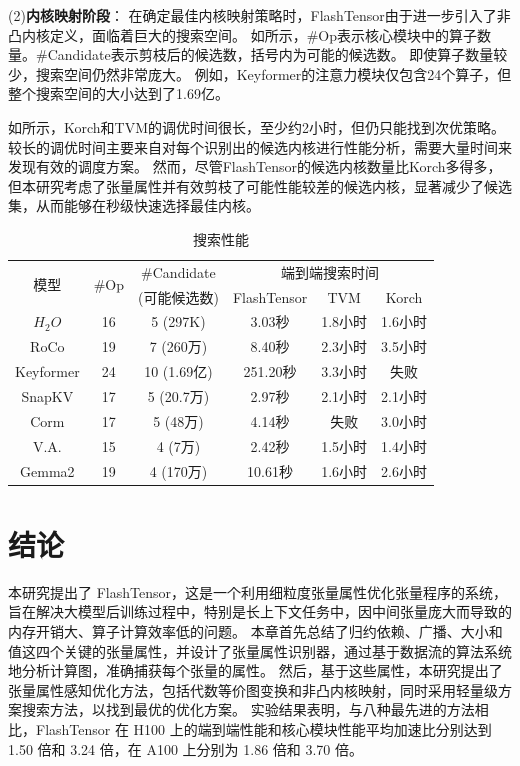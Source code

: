 (2)\textbf{内核映射阶段}：
在确定最佳内核映射策略时，FlashTensor由于进一步引入了非凸内核定义，面临着巨大的搜索空间。
如所示，\#Op表示核心模块中的算子数量。\#Candidate表示剪枝后的候选数，括号内为可能的候选数。
即使算子数量较少，搜索空间仍然非常庞大。
例如，Keyformer的注意力模块仅包含24个算子，但整个搜索空间的大小达到了1.69亿。

如所示，Korch和TVM的调优时间很长，至少约2小时，但仍只能找到次优策略。
较长的调优时间主要来自对每个识别出的候选内核进行性能分析，需要大量时间来发现有效的调度方案。
然而，尽管FlashTensor的候选内核数量比Korch多得多，但本研究考虑了张量属性并有效剪枝了可能性能较差的候选内核，显著减少了候选集，从而能够在秒级快速选择最佳内核。

\begin{table}[ht]
    \centering
    \caption{搜索性能}
    \begin{tabular}{cccccc}
    \toprule
      \multirow{2}{*}{模型} &  \multirow{2}{*}{\#Op}  & \#Candidate& \multicolumn{3}{c}{端到端搜索时间} \\
                              &  & (可能候选数)& FlashTensor & TVM & Korch \\
      \hline
      \(H_{2}O\)      & 16 & 5 (297K) & 3.03秒    & 1.8小时   & 1.6小时\\
      RoCo      & 19 & 7 (260万) & 8.40秒    & 2.3小时   & 3.5小时\\
      Keyformer & 24 & 10 (1.69亿) & 251.20秒 &3.3小时    & 失败 \\
      SnapKV    & 17 & 5 (20.7万) & 2.97秒    & 2.1小时   & 2.1小时\\
      Corm      & 17 & 5 (48万) & 4.14秒    & 失败 & 3.0小时\\
      V.A. & 15 & 4 (7万) & 2.42秒          & 1.5小时   & 1.4小时\\
      Gemma2    & 19  & 4 (170万) & 10.61秒  & 1.6小时   & 2.6小时 \\
      \bottomrule
    \end{tabular}
    \label{tab:search}
\end{table}


\section{结论}
本研究提出了 FlashTensor，这是一个利用细粒度张量属性优化张量程序的系统，旨在解决大模型后训练过程中，特别是长上下文任务中，因中间张量庞大而导致的内存开销大、算子计算效率低的问题。
本章首先总结了归约依赖、广播、大小和值这四个关键的张量属性，并设计了张量属性识别器，通过基于数据流的算法系统地分析计算图，准确捕获每个张量的属性。
然后，基于这些属性，本研究提出了张量属性感知优化方法，包括代数等价图变换和非凸内核映射，同时采用轻量级方案搜索方法，以找到最优的优化方案。
实验结果表明，与八种最先进的方法相比，FlashTensor 在 H100 上的端到端性能和核心模块性能平均加速比分别达到 1.50 倍和 3.24 倍，在 A100 上分别为 1.86 倍和 3.70 倍。

